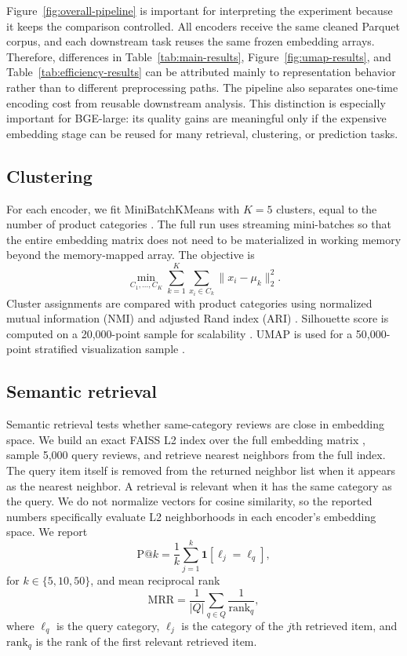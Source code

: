 \documentclass{article}
\begin{document}
Figure~\ref{fig:overall-pipeline} is important for interpreting the experiment because it keeps the comparison controlled. All encoders receive the same cleaned Parquet corpus, and each downstream task reuses the same frozen embedding arrays. Therefore, differences in Table~\ref{tab:main-results}, Figure~\ref{fig:umap-results}, and Table~\ref{tab:efficiency-results} can be attributed mainly to representation behavior rather than to different preprocessing paths. The pipeline also separates one-time encoding cost from reusable downstream analysis. This distinction is especially important for BGE-large: its quality gains are meaningful only if the expensive embedding stage can be reused for many retrieval, clustering, or prediction tasks.

\subsection{Clustering}
For each encoder, we fit MiniBatchKMeans with $K=5$ clusters, equal to the number of product categories \cite{macqueen1967,sculley2010}. The full run uses streaming mini-batches so that the entire embedding matrix does not need to be materialized in working memory beyond the memory-mapped array. The objective is
\begin{equation}
\min_{C_1,\ldots,C_K}\sum_{k=1}^K\sum_{x_i\in C_k}\|x_i-\mu_k\|_2^2.
\end{equation}
Cluster assignments are compared with product categories using normalized mutual information (NMI) and adjusted Rand index (ARI) \cite{strehl2002,hubert1985}. Silhouette score is computed on a 20,000-point sample for scalability \cite{rousseeuw1987}. UMAP is used for a 50,000-point stratified visualization sample \cite{mcinnes2018}.

\subsection{Semantic retrieval}
Semantic retrieval tests whether same-category reviews are close in embedding space. We build an exact FAISS L2 index over the full embedding matrix \cite{johnson2019}, sample 5,000 query reviews, and retrieve nearest neighbors from the full index. The query item itself is removed from the returned neighbor list when it appears as the nearest neighbor. A retrieval is relevant when it has the same category as the query. We do not normalize vectors for cosine similarity, so the reported numbers specifically evaluate L2 neighborhoods in each encoder's embedding space. We report
\begin{equation}
\mathrm{P@}k=\frac{1}{k}\sum_{j=1}^{k}\mathbf{1}[\ell_j=\ell_q],
\end{equation}
for $k \in \{5,10,50\}$, and mean reciprocal rank
\begin{equation}
\mathrm{MRR}=\frac{1}{|Q|}\sum_{q\in Q}\frac{1}{\mathrm{rank}_q},
\end{equation}
where $\ell_q$ is the query category, $\ell_j$ is the category of the $j$th retrieved item, and $\mathrm{rank}_q$ is the rank of the first relevant retrieved item.
\end{document}
